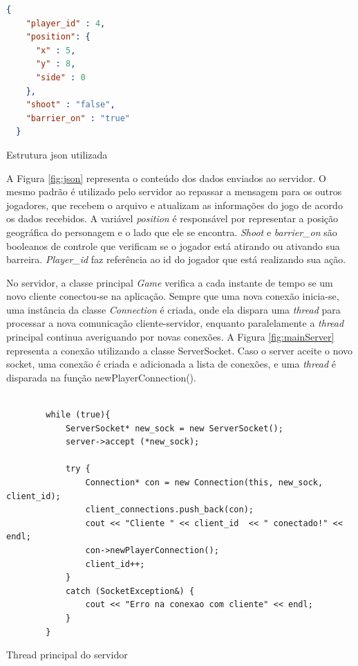 \begin{ilustracao}[h!]
  \begin{lstlisting}[language=json,firstnumber=1]
  {
    "player_id" : 4,
    "position": {
      "x" : 5,
      "y" : 8,
      "side" : 0
    },
    "shoot" : "false",
    "barrier_on" : "true"
  }
  \end{lstlisting}
  \caption{Estrutura json utilizada}
  \label{fig:json}

\end{ilustracao}


A Figura \ref{fig:json} representa o conteúdo dos dados enviados ao servidor. O mesmo padrão é utilizado pelo servidor ao repassar a mensagem para os outros jogadores, que recebem o arquivo e atualizam as informações do jogo de acordo os dados recebidos. A variável \textit{position} é responsável por representar a posição geográfica do personagem e o lado que ele se encontra. \textit{Shoot} e \textit{barrier\_on} são booleanos de controle que verificam se o jogador está atirando ou ativando sua barreira. \textit{Player\_id} faz referência ao id do jogador que está realizando sua ação. 

No servidor, a classe principal \textit{Game} verifica a cada instante de tempo se um novo cliente conectou-se na aplicação. Sempre que uma nova conexão inicia-se, uma instância da classe \textit{Connection} é criada, onde ela dispara uma \textit{thread} para processar a nova comunicação cliente-servidor, enquanto paralelamente a \textit{thread} principal continua averiguando por novas conexões. A Figura \ref{fig:mainServer} representa a conexão utilizando a classe ServerSocket. Caso o server aceite o novo socket, uma conexão é criada e adicionada a lista de conexões, e uma \textit{thread} é disparada na função newPlayerConnection().

\begin{ilustracao}
    \begin{lstlisting}

        while (true){
            ServerSocket* new_sock = new ServerSocket();
            server->accept (*new_sock);

            try {
                Connection* con = new Connection(this, new_sock, client_id);
                client_connections.push_back(con);
                cout << "Cliente " << client_id  << " conectado!" << endl;
                con->newPlayerConnection();
                client_id++;
            }
            catch (SocketException&) {
                cout << "Erro na conexao com cliente" << endl;
            }
        }
    \end{lstlisting}
    \caption{Thread principal do servidor}
    \label{fig:mainServer}
\end{ilustracao}

